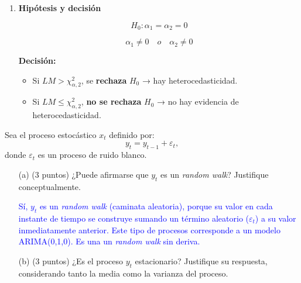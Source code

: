 \documentclass[10pt,a4paper]{article}
\begin{document}
\begin{enumerate}
{{{\begin{enumerate}
    Calcula el estadístico:

    \[
    LM = n \cdot R^2_{\text{aux}}\sim X^2_{df=2}
    \]

    Donde:

    \begin{itemize}
        \item \( n \): número de observaciones,
        \item \( R^2_{\text{aux}} \): coeficiente de determinación de la regresión auxiliar.

         El estadístico \( LM \) sigue una distribución \( \chi^2 \) con 2 grados de libertad.
    \end{itemize}

    \item \textbf{Hipótesis y decisión}

\[
H_0: \alpha_1=\alpha_2 = 0
\]
      
\[
 \alpha_1\neq 0 \quad  o \quad\alpha_2 \neq 0
\]


   

    \textbf{Decisión:}
    
    \begin{itemize}
        \item Si \( LM > \chi^2_{\alpha, 2} \), se \textbf{rechaza} \( H_0 \) → hay heterocedasticidad.
        \item Si \( LM \leq \chi^2_{\alpha, 2} \), \textbf{no se rechaza} \( H_0 \) → no hay evidencia de heterocedasticidad.
    \end{itemize}
\end{enumerate}

{\color{black}
\item  Sea el proceso estocástico \( x_t \) definido por:
\[
y_t = y_{t-1} + \varepsilon_t,
\]
donde \( \varepsilon_t \) es un proceso de ruido blanco. 

\begin{enumerate}
    \item[(a)] (3 puntos) ¿Puede afirmarse que \( y_t \) es un \textit{random walk}? Justifique conceptualmente.

    \textcolor{blue}{
        Sí, \( y_t \) es un \textit{random walk} (caminata aleatoria), porque su valor en cada instante de tiempo se construye sumando un término aleatorio (\( \varepsilon_t \)) a su valor inmediatamente anterior. Este tipo de procesos corresponde a un modelo ARIMA(0,1,0). Es una  un \textit{random walk} sin deriva.
        }
    \item[(b)]  (3 puntos) ¿Es el proceso \( y_t \) estacionario? Justifique su respuesta, considerando tanto la media como la varianza del proceso.


\end{enumerate}}}}}
\end{enumerate}
\end{document}

